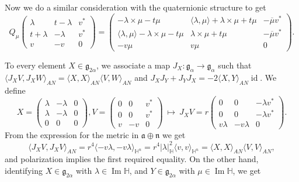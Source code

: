 \documentclass[12pt, a4paper]{amsart}
\newcommand{\id}{\operatorname{id}}
\newcommand{\g}{\mathfrak}
\renewcommand{\H}{\mathbb{H}}
\renewcommand{\Im}{\operatorname{Im}}
\theoremstyle{remark}
\begin{document}
Now we do a similar consideration with the quaternionic structure to get 
\[
Q_{\mu}\left(
\begin{array}{cc|c}
	\lambda & t-\lambda & v^{*} \\
	t+\lambda & -\lambda & v^{*} \\
	\hline
	v & -v & 0
\end{array}
\right)
=\left(
\begin{array}{cc|c}
-\lambda\times\mu-t\mu & \langle\lambda,\mu\rangle+\lambda\times\mu+t\mu & -\overline{\mu}v^{*} \\
\langle\lambda,\mu\rangle-\lambda\times\mu-t\mu & \lambda\times\mu+t\mu & -\overline{\mu}v^{*} \\
\hline
-v\mu & v\mu & 0
\end{array}
\right).
\]

To every element $X\in\g{g}_{2\alpha}$, we associate a map $J_{X}\colon\g{g}_{\alpha}\to\g{g}_{\alpha}$ such that 
$\langle J_X V,J_X W\rangle_{AN}=\langle X,X\rangle_{AN} \langle V,W\rangle_{AN}$ and 
$J_X J_Y+J_Y J_X=-2\langle X,Y\rangle_{AN}\id$.
We define
\begin{equation*}
X=\left(
\begin{array}{cc|c}
	\lambda & -\lambda & 0 \\
	\lambda & -\lambda & 0 \\
	\hline
	0 & 0 & 0
\end{array}
\right),
V=\left(
	\begin{array}{cc|c}
		0 & 0 & v^{*} \\
		0 & 0 & v^{*} \\
		\hline
		v & -v & 0
	\end{array}
\right)\ 
\mapsto\
J_{X}V=r\left(
	\begin{array}{cc|c}
		0 & 0 & -\lambda v^{*} \\
		0 & 0 & -\lambda v^{*} \\
		\hline
		v\lambda & -v\lambda & 0
	\end{array}
\right).
\end{equation*}
From the expression for the metric in $\g{a}\oplus\g{n}$ we get
\[
\langle J_X V,J_X V\rangle_{AN}
=r^4\langle -v\lambda,-v\lambda\rangle_{\H^n}
=r^4\lvert\lambda\rvert_{\H}^2\langle v, v\rangle_{\H^n}
=\langle X,X\rangle_{AN}\langle V, V\rangle_{AN},
\]	
and polarization implies the first required equality.
On the other hand, identifying $X\in\g{g}_{2\alpha}$ with $\lambda\in\Im\H$, and $Y\in\g{g}_{2\alpha}$ with $\mu\in\Im\H$, we get
\end{document}
